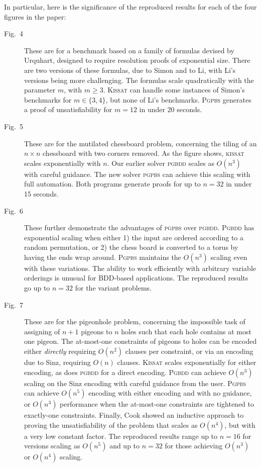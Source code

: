 \documentclass[runningheads]{llncs}
\newcommand{\pgbdd}{{\sffamily\scshape pgbdd}}
\newcommand{\Pgbdd}{{\sffamily\scshape  Pgbdd}}
\newcommand{\pgpbs}{{\sffamily\scshape  pgpbs}}
\newcommand{\Pgpbs}{{\sffamily\scshape  Pgpbs}}
\newcommand{\kissat}{{\sffamily\scshape kissat}}
\newcommand{\Kissat}{{\sffamily\scshape  Kissat}}
\begin{document}
In particular, here is the significance of the reproduced results for
each of the four figures in the paper:
\begin{description}
\item[Fig.~4] These are for a benchmark based on a family of formulas
  devised by Urquhart, designed to require resolution proofs of
  exponential size.  There are two versions of these formulas, due to
  Simon and to Li, with Li's versions being more challenging.  The
  formulas scale quadratically with the parameter $m$, with $m \geq
  3$.  \Kissat{} can handle some instances of Simon's benchmarks for
  $m \in \{3,4\}$, but none of Li's benchmarks.  \Pgpbs{} generates a
  proof of unsatisfiability for $m=12$ in under 20 seconds.

\item[Fig.~5] These are for the mutilated chessboard problem,
  concerning the tiling of an $n \times n$ chessboard with two corners
  removed.  As the figure shows, \kissat{} scales exponentially with
  $n$.  Our earlier solver \pgbdd{} scales as $O(n^3)$ with careful
  guidance.  The new solver \pgpbs{} can achieve this scaling with
  full automation. Both programs  generate proofs for up to
  $n=32$ in under 15 seconds.

\item[Fig.~6] These further demonstrate the advantages of \pgpbs{}
  over \pgbdd{}.  \Pgbdd{} has exponential scaling when either 1) the
  input are ordered according to a random permutation, or 2) the chess
  board is converted to a torus by having the ends wrap around.
  \Pgpbs{} maintains the $O(n^3)$ scaling even with these variations.
  The ability to work efficiently with arbitrary variable orderings is
  unusual for BDD-based applications.  The reproduced results go up to
  $n=32$ for the variant problems.

\item[Fig.~7] These are for the pigeonhole problem, concerning the
  impossible task of assigning of $n+1$ pigeons to $n$ holes such that
  each hole contains at most one pigeon.  The at-most-one constraints
  of pigeons to holes can be encoded either {\em directly} requiring
  $O(n^2)$ clauses per constraint, or via an encoding due to Sinz,
  requiring $O(n)$ clauses.  \Kissat{} scales exponentially for either
  encoding, as does \pgbdd{} for a direct encoding.  \Pgbdd{} can
  achieve $O(n^3)$ scaling on the Sinz encoding with careful guidance
  from the user.  \Pgpbs{} can achieve $O(n^5)$ encoding with either
  encoding and with no guidance, or $O(n^3)$ performance when the
  at-most-one constraints are tightened to exactly-one constraints.
  Finally, Cook showed an inductive approach to proving the
  unsatisfiability of the problem that scales as $O(n^4)$, but with a
  very low constant factor.  The reproduced results range up to $n=16$
  for versions scaling as $O(n^5)$ and up to $n=32$ for those achieving
  $O(n^3)$ or $O(n^4)$ scaling.
 
\end{description}
\end{document}
